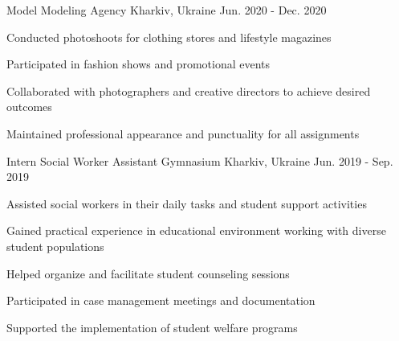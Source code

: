 \begin{cventries}
\cventry
{Model} %
{Modeling Agency} %
{Kharkiv, Ukraine} %
{Jun. 2020 - Dec. 2020} %
{ %
\begin{cvitems}
\item {Conducted photoshoots for clothing stores and lifestyle magazines}
\item {Participated in fashion shows and promotional events}
\item {Collaborated with photographers and creative directors to achieve desired outcomes}
\item {Maintained professional appearance and punctuality for all assignments}
\end{cvitems}
}


\cventry
{Intern Social Worker Assistant} %
{Gymnasium} %
{Kharkiv, Ukraine} %
{Jun. 2019 - Sep. 2019} %
{ %
\begin{cvitems}
\item {Assisted social workers in their daily tasks and student support activities}
\item {Gained practical experience in educational environment working with diverse student populations}
\item {Helped organize and facilitate student counseling sessions}
\item {Participated in case management meetings and documentation}
\item {Supported the implementation of student welfare programs}
\end{cvitems}
}


\end{cventries}